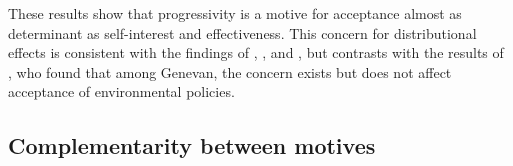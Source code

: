 \documentclass[11pt]{article}
\begin{document}

These results show that progressivity is a motive for acceptance almost as determinant as self-interest and effectiveness. This concern for distributional effects is consistent with the findings of \citet{kallbekken_saelen_2011}, \citet{brannlund_tax_2012}, and \citet{gevrek_public_2015}, but contrasts with the results of \citet{baranzini_effectiveness_2017}, who found that among Genevan, the concern exists but does not affect acceptance of environmental policies.

\subsection{Complementarity between motives}

\end{document}
